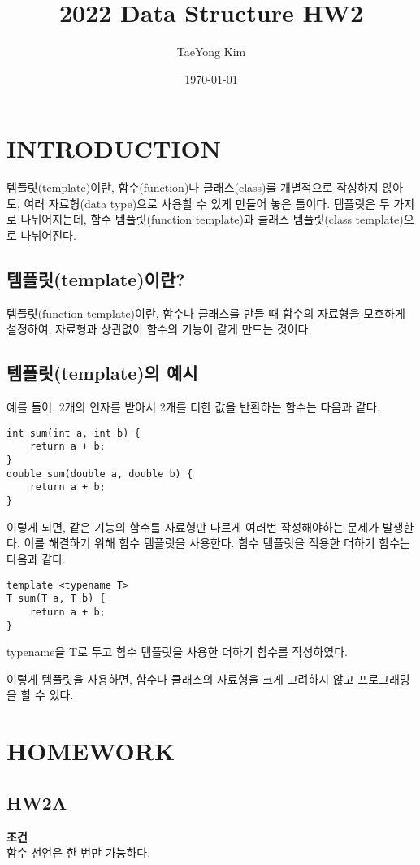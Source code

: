 \documentclass{article}
\title{2022 Data Structure HW2}
\author{TaeYong Kim}
\date{\today}
\begin{document}
\maketitle

\section{INTRODUCTION}
템플릿(template)이란, 함수(function)나 클래스(class)를 개별적으로 작성하지 않아도, 여러 자료형(data type)으로 사용할 수 있게 만들어 놓은 틀이다. 템플릿은 두 가지로 나뉘어지는데, 함수 템플릿(function template)과 클래스 템플릿(class template)으로 나뉘어진다.

\subsection{템플릿(template)이란?}
템플릿(function template)이란, 함수나 클래스를 만들 때 함수의 자료형을 모호하게 설정하여, 자료형과 상관없이 함수의 기능이 같게 만드는 것이다.

\subsection{템플릿(template)의 예시}

예를 들어, 2개의 인자를 받아서 2개를 더한 값을 반환하는 함수는 다음과 같다.

\begin{verbatim}
int sum(int a, int b) {
    return a + b;
}
double sum(double a, double b) {
    return a + b;
}
\end{verbatim}

이렇게 되면, 같은 기능의 함수를 자료형만 다르게 여러번 작성해야하는 문제가 발생한다. 이를 해결하기 위해 함수 템플릿을 사용한다. 함수 템플릿을 적용한 더하기 함수는 다음과 같다.

\begin{verbatim}
template <typename T>
T sum(T a, T b) {
    return a + b;
}
\end{verbatim}

typename을 T로 두고 함수 템플릿을 사용한 더하기 함수를 작성하였다.

이렇게 템플릿을 사용하면, 함수나 클래스의 자료형을 크게 고려하지 않고 프로그래밍을 할 수 있다.


\section{HOMEWORK}

\subsection{HW2A}
\noindent \textbf{조건} \\ 함수 선언은 한 번만 가능하다. \\
\end{document}
